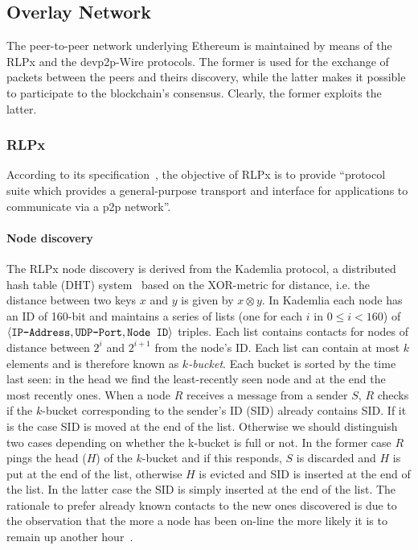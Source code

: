 \subsection{Overlay Network}
The peer-to-peer network underlying Ethereum is maintained by means of the 
RLPx and the devp2p-Wire protocols.
The former is used for the exchange of packets between the peers and theirs
discovery, while the latter makes it possible to participate to the 
blockchain's consensus. Clearly, the former exploits the latter.

\subsubsection{RLPx}
According to its specification~\cite{}, the objective of RLPx is to
provide ``protocol suite which
provides a general-purpose transport and interface for applications to
communicate via a p2p network''.

\paragraph{Node discovery}
The RLPx node discovery is derived from the Kademlia protocol,
a distributed hash table (DHT) system~\cite{bib:kademlia} 
based on the XOR-metric for 
distance, i.e. the distance between two keys $x$ and $y$ is given 
by $x \otimes y$.
In Kademlia each node has an ID of 160-bit and maintains a
series of lists (one for each $i$ in $0 \leq i < 160$) of 
$\langle \verb|IP-Address|, \verb|UDP-Port|, \verb|Node ID| \rangle$ triples.
Each list contains contacts for nodes of distance between $2^i$ and $2^{i+1}$ 
from the node's ID.
Each list can contain at most $k$ elements and is therefore known as 
\textit{$k$-bucket}.
Each bucket is sorted by the time last
seen: in the head we find the least-recently seen node and at the end the most
recently ones.
When a node $R$ receives a message from a sender $S$, $R$ checks if the
$k$-bucket corresponding to the sender's ID (SID) already contains SID.
If it is the case SID is moved at the end of the list. Otherwise we should
distinguish two cases depending on whether the k-bucket is full or not.
In the former case $R$ pings the head ($H$) of the $k$-bucket and if
this responds, $S$ is discarded and $H$ is put at the end of the list,
otherwise $H$ is evicted and SID is inserted at the end of the list.
In the latter case the SID is simply inserted at the end of the list.
The rationale to prefer already known contacts to the new ones discovered
is due to the observation that the more a node has been on-line the more
likely it is to remain up another hour~\cite{bib:kademlia}.

